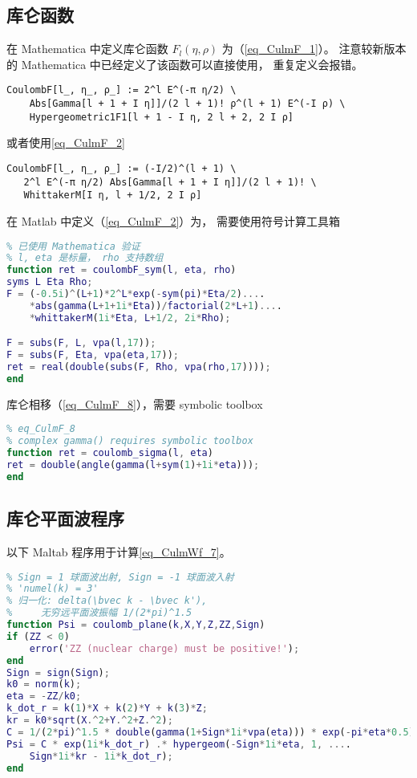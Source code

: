 


\subsection{库仑函数}
在 Mathematica 中定义库仑函数 $F_l(\eta, \rho)$ 为（\autoref{eq_CulmF_1}）。 注意较新版本的 Mathematica 中已经定义了该函数可以直接使用， 重复定义会报错。
\begin{lstlisting}[language=mma] % 已验证
CoulombF[l_, η_, ρ_] := 2^l E^(-π η/2) \
    Abs[Gamma[l + 1 + I η]]/(2 l + 1)! ρ^(l + 1) E^(-I ρ) \
    Hypergeometric1F1[l + 1 - I η, 2 l + 2, 2 I ρ]
\end{lstlisting}
或者使用\autoref{eq_CulmF_2}  %
\begin{lstlisting}[language=mma]
CoulombF[l_, η_, ρ_] := (-I/2)^(l + 1) \
   2^l E^(-π η/2) Abs[Gamma[l + 1 + I η]]/(2 l + 1)! \
   WhittakerM[I η, l + 1/2, 2 I ρ]
\end{lstlisting}

在 Matlab 中定义（\autoref{eq_CulmF_2}）为， 需要使用符号计算工具箱 %
\begin{lstlisting}[language=matlab, caption=coulombF\_sym.m]
% 第一类库仑函数 F_l(eta, rho)
% 已使用 Mathematica 验证
% l, eta 是标量， rho 支持数组
function ret = coulombF_sym(l, eta, rho)
syms L Eta Rho;
F = (-0.5i)^(L+1)*2^L*exp(-sym(pi)*Eta/2)....
    *abs(gamma(L+1+1i*Eta))/factorial(2*L+1)....
    *whittakerM(1i*Eta, L+1/2, 2i*Rho);

F = subs(F, L, vpa(l,17));
F = subs(F, Eta, vpa(eta,17));
ret = real(double(subs(F, Rho, vpa(rho,17))));
end
\end{lstlisting}

库仑相移（\autoref{eq_CulmF_8}），需要 symbolic toolbox
\begin{lstlisting}[language=matlab, caption=coulomb\_sigma.m]
% coulomb phase
% eq_CulmF_8
% complex gamma() requires symbolic toolbox
function ret = coulomb_sigma(l, eta)
ret = double(angle(gamma(l+sym(1)+1i*eta)));
end
\end{lstlisting}

\subsection{库仑平面波程序}
以下 Maltab 程序用于计算\autoref{eq_CulmWf_7}。
\begin{lstlisting}[language=matlab, caption=coulomb\_plane.m]
% 直角坐标系的库仑平面波
% Sign = 1 球面波出射, Sign = -1 球面波入射
% 'numel(k) = 3'
% 归一化: delta(\bvec k - \bvec k'),
%     无穷远平面波振幅 1/(2*pi)^1.5
function Psi = coulomb_plane(k,X,Y,Z,ZZ,Sign)
if (ZZ < 0)
    error('ZZ (nuclear charge) must be positive!');
end
Sign = sign(Sign);
k0 = norm(k);
eta = -ZZ/k0;
k_dot_r = k(1)*X + k(2)*Y + k(3)*Z;
kr = k0*sqrt(X.^2+Y.^2+Z.^2);
C = 1/(2*pi)^1.5 * double(gamma(1+Sign*1i*vpa(eta))) * exp(-pi*eta*0.5);
Psi = C * exp(1i*k_dot_r) .* hypergeom(-Sign*1i*eta, 1, ....
    Sign*1i*kr - 1i*k_dot_r);
end
\end{lstlisting}

